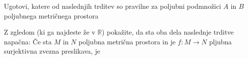 \documentclass[11pt,a4paper]{exam}
\renewcommand{\subset}{\subseteq}
\renewcommand{\{}{\lbrace}
\renewcommand{\}}{\rbrace}
\begin{document}
\begin{questions}
	\question Ugotovi, katere od naslednjih trditev so pravilne za poljubni podmnožici $A$ in $B$ poljubnega metričnega prostora

	\question Z zgledom (ki ga najdeste že v $\mathbb{R}$) pokažite, da sta oba dela naslednje trditve napačna: Če sta $M$ in $N$ poljubna metrična prostora in je $f: M \to N$ pljubna surjektivna zvezna preslikava, je
		
\end{questions}
\end{document}
